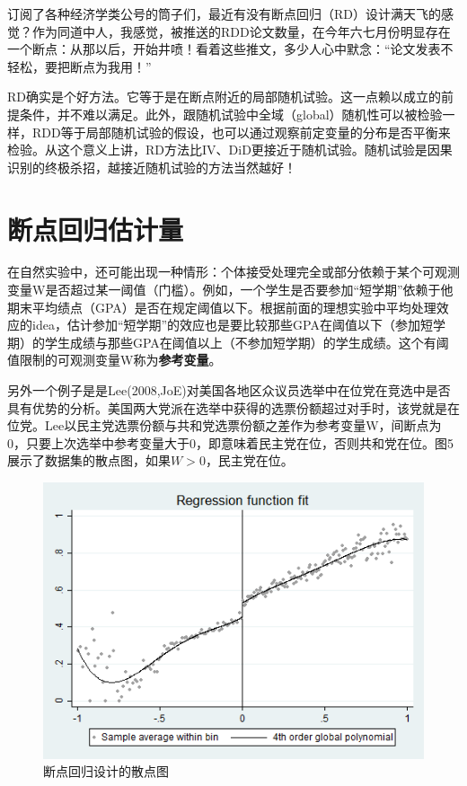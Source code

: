 \documentclass[cn,12pt,math=newtx,citestyle=gb7714-2015,bibstyle=gb7714-2015]{elegantbook}
\begin{document}
	订阅了各种经济学类公号的筒子们，最近有没有断点回归（RD）设计满天飞的感觉？作为同道中人，我感觉，被推送的RDD论文数量，在今年六七月份明显存在一个断点：从那以后，开始井喷！看着这些推文，多少人心中默念：“论文发表不轻松，要把断点为我用！”
	
	RD确实是个好方法。它等于是在断点附近的局部随机试验。这一点赖以成立的前提条件，并不难以满足。此外，跟随机试验中全域（global）随机性可以被检验一样，RDD等于局部随机试验的假设，也可以通过观察前定变量的分布是否平衡来检验。从这个意义上讲，RD方法比IV、DiD更接近于随机试验。随机试验是因果识别的终极杀招，越接近随机试验的方法当然越好！
	
	\section{断点回归估计量}
	
	在自然实验中，还可能出现一种情形：个体接受处理完全或部分依赖于某个可观测变量W是否超过某一阈值（门槛）。例如，一个学生是否要参加“短学期”依赖于他期末平均绩点（GPA）是否在规定阈值以下。根据前面的理想实验中平均处理效应的idea，估计参加“短学期”的效应也是要比较那些GPA在阈值以下（参加短学期）的学生成绩与那些GPA在阈值以上（不参加短学期）的学生成绩。这个有阈值限制的可观测变量W称为\textbf{参考变量}。
	
	另外一个例子是是Lee(2008,JoE)对美国各地区众议员选举中在位党在竞选中是否具有优势的分析。美国两大党派在选举中获得的选票份额超过对手时，该党就是在位党。Lee以民主党选票份额与共和党选票份额之差作为参考变量W，间断点为0，只要上次选举中参考变量大于0，即意味着民主党在位，否则共和党在位。图5展示了数据集的散点图，如果$W>0$，民主党在位。
	\begin{figure}[htbp]
		\centering
		\includegraphics[width=1\textwidth]{rdgraph.png}
		\caption{断点回归设计的散点图}\label{fig:digit}
	\end{figure}
	
\end{document}
